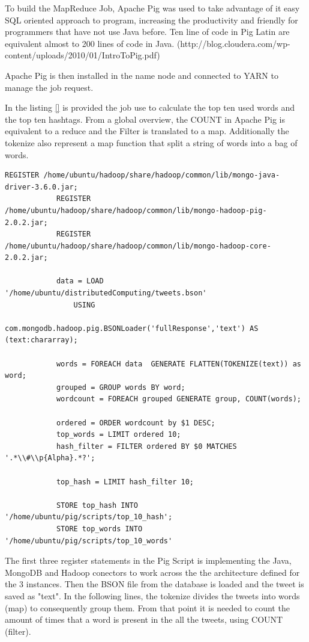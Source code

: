\documentclass{article}
\begin{document}
        To build the MapReduce Job, Apache Pig was used to take advantage of it easy SQL oriented approach to program, increasing the productivity and friendly for programmers that have not use Java before.
        Ten line of code in Pig Latin are equivalent almost to 200 lines of code in Java. (http://blog.cloudera.com/wp-content/uploads/2010/01/IntroToPig.pdf)

        Apache Pig is then installed in the name node and connected to YARN to manage the job request. 
        
        In the listing \ref{} is provided the job use to calculate the top ten used words and the top ten hashtags. From a global overview, the COUNT in Apache Pig is equivalent to a reduce and the Filter is translated to a map.
        Additionally the tokenize also represent a  map function that split a string of words into a bag of words.

        \begin{lstlisting}[caption= Tweet cleaning function, label={lst:dataCleaning}]
            REGISTER /home/ubuntu/hadoop/share/hadoop/common/lib/mongo-java-driver-3.6.0.jar;
            REGISTER /home/ubuntu/hadoop/share/hadoop/common/lib/mongo-hadoop-pig-2.0.2.jar;
            REGISTER /home/ubuntu/hadoop/share/hadoop/common/lib/mongo-hadoop-core-2.0.2.jar;
            
            data = LOAD '/home/ubuntu/distributedComputing/tweets.bson'
                USING
                com.mongodb.hadoop.pig.BSONLoader('fullResponse','text') AS (text:chararray);
            
            words = FOREACH data  GENERATE FLATTEN(TOKENIZE(text)) as word;
            grouped = GROUP words BY word;
            wordcount = FOREACH grouped GENERATE group, COUNT(words);
            
            ordered = ORDER wordcount by $1 DESC;
            top_words = LIMIT ordered 10;
            hash_filter = FILTER ordered BY $0 MATCHES '.*\\#\\p{Alpha}.*?';
            
            top_hash = LIMIT hash_filter 10;

            STORE top_hash INTO '/home/ubuntu/pig/scripts/top_10_hash';
            STORE top_words INTO '/home/ubuntu/pig/scripts/top_10_words'

        \end{lstlisting}

        The first three register statements in the Pig Script is implementing the Java, MongoDB and Hadoop conectors to work across the the architecture defined for the 3 instances. Then
        the BSON file from the database is loaded and the tweet is saved as "text". In the following lines, the tokenize divides the tweets into words (map) to consequently group them.
        From that point it is needed to count the amount of times that a word is present in the all the tweets, using COUNT (filter).
        
\end{document}
